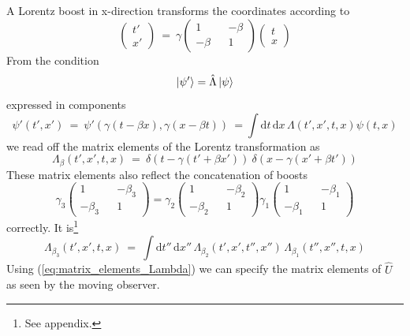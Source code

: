 \documentclass[12pt]{article}
\begin{document}
A Lorentz boost in x-direction transforms the coordinates according to
\begin{equation*}
\begin{pmatrix} t' \\ x' \end{pmatrix}\ =\ 
\gamma \begin{pmatrix} 1 && -\beta \\ -\beta && 1 \end{pmatrix}
\begin{pmatrix} t \\ x \end{pmatrix}
\end{equation*}
From the condition 
\begin{equation*}
\ket{\psi'}=\hat{\Lambda}\ket{\psi}
\end{equation*}
expressed in components
\begin{equation*}
\psi'(t',x')\ =\ \psi'(\gamma(t-\beta x),\gamma(x-\beta t))\ = \int \mathrm{d}t\,\mathrm{d}x\, \Lambda(t',x',t,x) \psi(t,x)
\end{equation*}
we read off the matrix elements of the Lorentz transformation as
\begin{equation}\label{eq:matrix_elements_Lambda}
\Lambda_\beta(t',x',t,x)\ =\ \delta(t-\gamma(t'+\beta x'))\ \delta(x-\gamma(x'+\beta t'))
\end{equation}
These matrix elements also reflect the concatenation of boosts 
\begin{equation*}
\gamma_3 \begin{pmatrix} 1 && -\beta_3 \\ -\beta_3 && 1 \end{pmatrix} =
\gamma_2 \begin{pmatrix} 1 && -\beta_2 \\ -\beta_2 && 1 \end{pmatrix}
\gamma_1 \begin{pmatrix} 1 && -\beta_1 \\ -\beta_1 && 1 \end{pmatrix}
\end{equation*}
correctly. It is\footnote{See appendix.}
\begin{equation} \label{eq:chained_boosts}
\Lambda_{\beta_3}(t',x',t,x)\ =\ \int \mathrm{d}t''\,\mathrm{d}x''\, \Lambda_{\beta_2}(t',x',t'',x'')\, \Lambda_{\beta_1}(t'',x'',t,x)
\end{equation}
Using (\ref{eq:matrix_elements_Lambda}) we can specify the matrix elements of $\hat{U}$ as seen by the moving observer.
\end{document}
